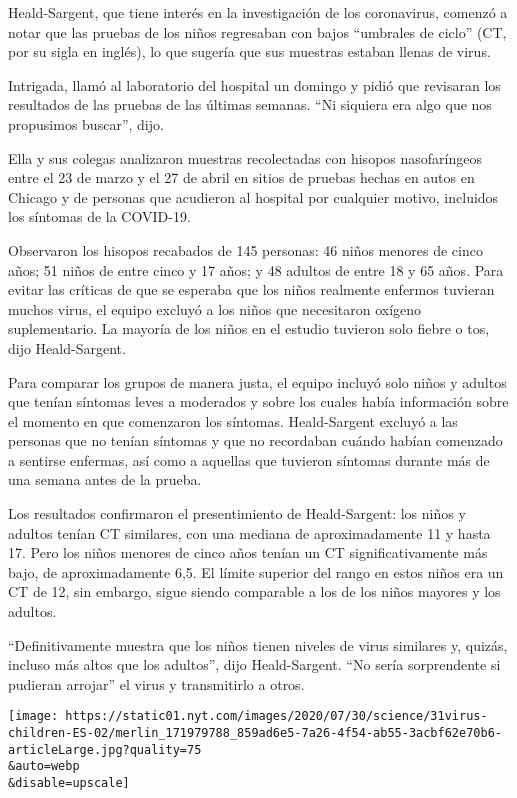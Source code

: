 Heald-Sargent, que tiene interés en la investigación de los coronavirus,
comenzó a notar que las pruebas de los niños regresaban con bajos
``umbrales de ciclo'' (CT, por su sigla en inglés), lo que sugería que
sus muestras estaban llenas de virus.

Intrigada, llamó al laboratorio del hospital un domingo y pidió que
revisaran los resultados de las pruebas de las últimas semanas. ``Ni
siquiera era algo que nos propusimos buscar'', dijo.

Ella y sus colegas analizaron muestras recolectadas con hisopos
nasofaríngeos entre el 23 de marzo y el 27 de abril en sitios de pruebas
hechas en autos en Chicago y de personas que acudieron al hospital por
cualquier motivo, incluidos los síntomas de la COVID-19.

Observaron los hisopos recabados de 145 personas: 46 niños menores de
cinco años; 51 niños de entre cinco y 17 años; y 48 adultos de entre 18
y 65 años. Para evitar las críticas de que se esperaba que los niños
realmente enfermos tuvieran muchos virus, el equipo excluyó a los niños
que necesitaron oxígeno suplementario. La mayoría de los niños en el
estudio tuvieron solo fiebre o tos, dijo Heald-Sargent.

Para comparar los grupos de manera justa, el equipo incluyó solo niños y
adultos que tenían síntomas leves a moderados y sobre los cuales había
información sobre el momento en que comenzaron los síntomas.
Heald-Sargent excluyó a las personas que no tenían síntomas y que no
recordaban cuándo habían comenzado a sentirse enfermas, así como a
aquellas que tuvieron síntomas durante más de una semana antes de la
prueba.

Los resultados confirmaron el presentimiento de Heald-Sargent: los niños
y adultos tenían CT similares, con una mediana de aproximadamente 11 y
hasta 17. Pero los niños menores de cinco años tenían un CT
significativamente más bajo, de aproximadamente 6,5. El límite superior
del rango en estos niños era un CT de 12, sin embargo, sigue siendo
comparable a los de los niños mayores y los adultos.

``Definitivamente muestra que los niños tienen niveles de virus
similares y, quizás, incluso más altos que los adultos'', dijo
Heald-Sargent. ``No sería sorprendente si pudieran arrojar'' el virus y
transmitirlo a otros.

\texttt{[image: https://static01.nyt.com/images/2020/07/30/science/31virus-children-ES-02/merlin\_171979788\_859ad6e5-7a26-4f54-ab55-3acbf62e70b6-articleLarge.jpg?quality=75\\\&auto=webp\\\&disable=upscale]}

